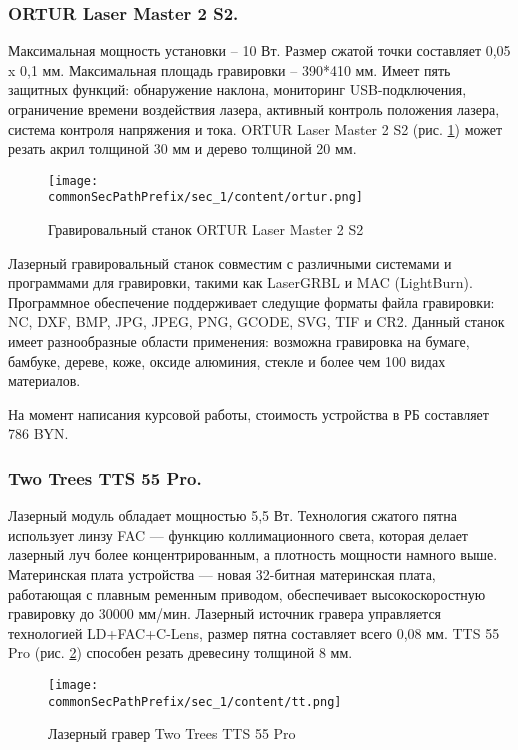 \subsubsection{ORTUR Laser Master 2 S2.}
Максимальная мощность установки -- 10 Вт. Размер сжатой точки составляет 0,05 x 0,1 мм. 
Максимальная площадь гравировки -- 390*410 мм. 
Имеет пять защитных функций: обнаружение наклона, мониторинг USB-подключения, ограничение времени воздействия лазера, 
активный контроль положения лазера, система контроля напряжения и тока.
ORTUR Laser Master 2 S2 (рис. \ref{fig:ortur}) может резать акрил толщиной 30 мм и дерево толщиной 20 мм.
\begin{figure}[ht]
    \centering
    \texttt{[image: \\commonSecPathPrefix/sec\_1/content/ortur.png]}
    \caption{Гравировальный станок ORTUR Laser Master 2 S2}
    \label{fig:ortur}
\end{figure}

Лазерный гравировальный станок совместим с различными системами и программами для гравировки, такими как LaserGRBL и MAC (LightBurn). 
Программное обеспечение поддерживает следущие форматы файла гравировки: NC, DXF, BMP, JPG, JPEG, PNG, GCODE, SVG, TIF и CR2.
Данный станок имеет разнообразные области применения: возможна гравировка на бумаге, бамбуке, дереве, коже, 
оксиде алюминия, стекле и более чем 100 видах материалов.

На момент написания курсовой работы, стоимость устройства в РБ составляет 786 BYN.

\subsubsection{Two Trees TTS 55 Pro.}
Лазерный модуль обладает мощностью 5,5 Вт. Технология сжатого пятна использует линзу FAC — 
функцию коллимационного света, которая делает лазерный луч более концентрированным, 
а плотность мощности намного выше. Материнская плата устройства — 
новая 32-битная материнская плата, работающая с плавным ременным приводом, обеспечивает 
высокоскоростную гравировку до 30000 мм/мин. 
Лазерный источник гравера управляется технологией LD+FAC+C-Lens, размер пятна составляет всего 0,08 мм.
TTS 55 Pro (рис. \ref{fig:tt}) способен резать древесину толщиной 8 мм.
\begin{figure}[ht]
    \centering
    \texttt{[image: \\commonSecPathPrefix/sec\_1/content/tt.png]}
    \caption{Лазерный гравер Two Trees TTS 55 Pro}
    \label{fig:tt}
\end{figure}

